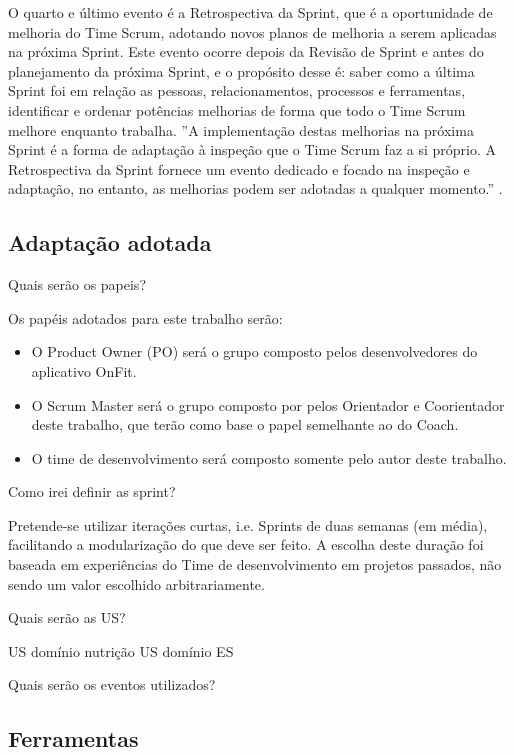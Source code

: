 	O quarto e último evento é a Retrospectiva da Sprint, que é a oportunidade de melhoria do Time Scrum, adotando novos planos de melhoria a serem aplicadas na próxima Sprint. Este evento ocorre depois da Revisão de Sprint e antes do planejamento da próxima Sprint, e o propósito desse é: saber como a última Sprint foi em relação as pessoas, relacionamentos, processos e ferramentas, identificar e ordenar potências melhorias de forma que todo o Time Scrum melhore enquanto trabalha. ''A implementação destas melhorias na próxima Sprint é a forma de adaptação à inspeção que o Time Scrum faz a si próprio. A Retrospectiva da Sprint fornece um evento dedicado e focado na inspeção e adaptação, no entanto, as melhorias podem ser adotadas a qualquer momento.'' \cite[p.~13]{scrum}.  

\subsection{Adaptação adotada} 

	Quais serão os papeis?
	
		Os papéis adotados para este trabalho serão:
	
		\begin{itemize}
			\item O Product Owner (PO) será o grupo composto pelos desenvolvedores do aplicativo OnFit. 
			\item O Scrum Master será o grupo composto por pelos Orientador e Coorientador deste trabalho, que terão como base o papel semelhante ao do Coach. 
			\item O time de desenvolvimento será composto somente pelo autor deste trabalho.
		\end{itemize}

	Como irei definir as sprint?

		Pretende-se utilizar iterações curtas, i.e. Sprints de duas semanas (em média), facilitando a modularização do que deve ser feito. A escolha deste duração foi baseada em experiências do Time de desenvolvimento em projetos passados, não sendo um valor escolhido arbitrariamente.

	Quais serão as US?

		US domínio nutrição
		US domínio ES

	Quais serão os eventos utilizados?


\subsection{Ferramentas}

